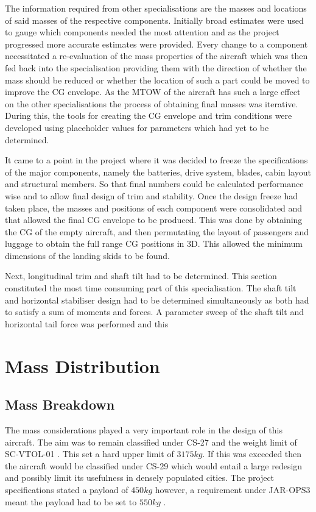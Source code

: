 \documentclass[11pt,a4paper]{article}
\begin{document}
The information required from other specialisations are the masses and locations of said masses of the respective components. Initially broad estimates were used to gauge which components needed the most attention and as the project progressed more accurate estimates were provided. Every change to a component necessitated a re-evaluation of the mass properties of the aircraft which was then fed back into the specialisation providing them with the direction of whether the mass should be reduced or whether the location of such a part could be moved to improve the CG envelope. As the MTOW of the aircraft has such a large effect on the other specialisations the process of obtaining final masses was iterative. During this, the tools for creating the  CG envelope and trim conditions were developed using placeholder values for parameters which had yet to be determined.

It came to a point in the project where it was decided to freeze the specifications of the major components, namely the batteries, drive system, blades, cabin layout and structural members. So that final numbers could be calculated performance wise and to allow final design of trim and stability.
Once the design freeze had taken place, the masses and positions of each component were consolidated and that allowed the final CG envelope to be produced. This was done by obtaining the CG of the empty aircraft, and then permutating the layout of passengers and luggage to obtain the full range CG positions in 3D. This allowed the minimum dimensions of the landing skids to be found. 

Next, longitudinal trim and shaft tilt had to be determined. This section constituted the most time consuming part of this specialisation. The shaft tilt and horizontal stabiliser design had to be determined simultaneously as both had to satisfy a sum of moments and forces. A parameter sweep of the shaft tilt and horizontal tail force was performed and this 




\newpage
\section{Mass Distribution}
\subsection{Mass Breakdown}
The mass considerations played a very important role in the design of this aircraft. The aim was to remain classified under CS-27 and the weight limit of SC-VTOL-01 \cite{cs27}\cite{scvtol}. This set a hard upper limit of $3175kg$. If this was exceeded then the aircraft would be classified under CS-29 which would entail a large redesign and possibly limit its usefulness in densely populated cities. The project specifications stated a payload of $450kg$ however, a requirement under JAR-OPS3 meant the payload had to be set to $550kg$ \cite{jarops3}.
\end{document}

